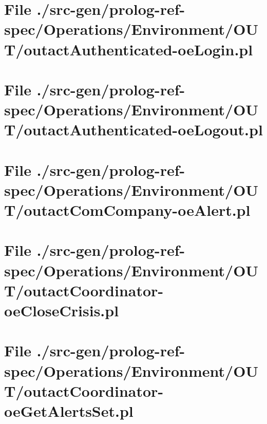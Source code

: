 \section[File /src-gen/prolog-ref-spec/Operations.../outactAuthenticated-oeLogin.pl]{File ./src-gen/prolog-ref-spec/Operations/Environment/OUT/outactAuthenticated-oeLogin.pl}
\scriptsize

\normalsize
	
\section[File /src-gen/prolog-ref-spec/Operations.../outactAuthenticated-oeLogout.pl]{File ./src-gen/prolog-ref-spec/Operations/Environment/OUT/outactAuthenticated-oeLogout.pl}
\scriptsize

\normalsize
	
\section[File /src-gen/prolog-ref-spec/Operations.../outactComCompany-oeAlert.pl]{File ./src-gen/prolog-ref-spec/Operations/Environment/OUT/outactComCompany-oeAlert.pl}
\scriptsize

\normalsize
	
\section[File /src-gen/prolog-ref-spec/Operations.../outactCoordinator-oeCloseCrisis.pl]{File ./src-gen/prolog-ref-spec/Operations/Environment/OUT/outactCoordinator-oeCloseCrisis.pl}
\scriptsize

\normalsize
	
\section[File /src-gen/prolog-ref-spec/Operations.../outactCoordinator-oeGetAlertsSet.pl]{File ./src-gen/prolog-ref-spec/Operations/Environment/OUT/outactCoordinator-oeGetAlertsSet.pl}
\scriptsize

\normalsize
	
